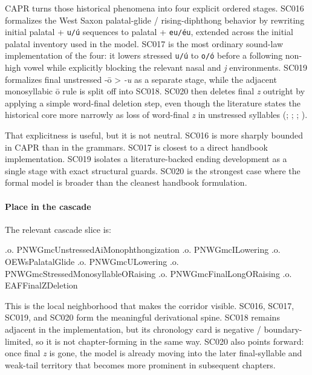 \documentclass[
  british,
  a4paper,
]{article}
\newenvironment{Shaded}{}{}
\newcommand{\NormalTok}[1]{#1}
\begin{document}
CAPR turns those historical phenomena into four explicit ordered stages.
SC016 formalizes the West Saxon palatal-glide / rising-diphthong
behavior by rewriting initial palatal + \texttt{u/ú} sequences to
palatal + \texttt{eu/éu}, extended across the initial palatal inventory
used in the model. SC017 is the most ordinary sound-law implementation
of the four: it lowers stressed \texttt{u/ú} to \texttt{o/ó} before a
following non-high vowel while explicitly blocking the relevant nasal
and \emph{j} environments. SC019 formalizes final unstressed -ō
\textgreater{} \emph{-u} as a separate stage, while the adjacent
monosyllabic ō rule is split off into SC018. SC020 then deletes final
\emph{z} outright by applying a simple word-final deletion step, even
though the literature states the historical core more narrowly as loss
of word-final \emph{z} in unstressed syllables
(;
; ; ).

That explicitness is useful, but it is not neutral. SC016 is more
sharply bounded in CAPR than in the grammars. SC017 is closest to a
direct handbook implementation. SC019 isolates a literature-backed
ending development as a single stage with exact structural guards. SC020
is the strongest case where the formal model is broader than the
cleanest handbook formulation.

\paragraph{Place in the cascade}\label{place-in-the-cascade-12}

The relevant cascade slice is:

\begin{Shaded}
\begin{Highlighting}[]
\NormalTok{.o. PNWGmcUnstressedAiMonophthongization}
\NormalTok{.o. PNWGmcILowering}
\NormalTok{.o. OEWsPalatalGlide}
\NormalTok{.o. PNWGmcULowering}
\NormalTok{.o. PNWGmcStressedMonosyllableORaising}
\NormalTok{.o. PNWGmcFinalLongORaising}
\NormalTok{.o. EAFFinalZDeletion}
\end{Highlighting}
\end{Shaded}

This is the local neighborhood that makes the corridor visible. SC016,
SC017, SC019, and SC020 form the meaningful derivational spine. SC018
remains adjacent in the implementation, but its chronology card is
negative / boundary-limited, so it is not chapter-forming in the same
way. SC020 also points forward: once final \emph{z} is gone, the model
is already moving into the later final-syllable and weak-tail territory
that becomes more prominent in subsequent chapters.
\end{document}

